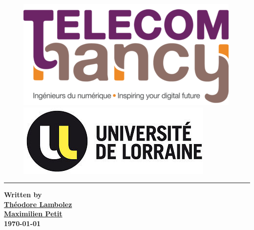 \documentclass{scrreprt}
\date{}
\begin{document}
\begin{figure}
   \begin{minipage}[c]{.46\linewidth}
      \includegraphics[scale=0.3]{images/telecom.png}
   \end{minipage} \hfill
   \begin{minipage}[c]{.46\linewidth}
      \includegraphics[scale=1.9]{images/lorraine.jpg}
   \end{minipage}
\end{figure}
\begin{flushright}
    \rule{15cm}{5pt}
    \vskip1cm
\end{flushright}
\begin{center}
	\vspace{3cm}
\end{center}
\begin{flushright}
        \vspace{5cm}
	\huge{
        \textbf{
	Written by \\
	\vspace{0,875cm}
	\href{mailto:theodore.lambolez@telecomnancy.eu}{Théodore Lambolez} \\
	\href{mailto:maximilien.petit@telecomnancy.eu}{Maximilien Petit}\\
	}
	}
        \vspace{0,5cm}
        \large{
	\textbf{
	\today\\
	}	
	}
\end{flushright}
\end{document}
